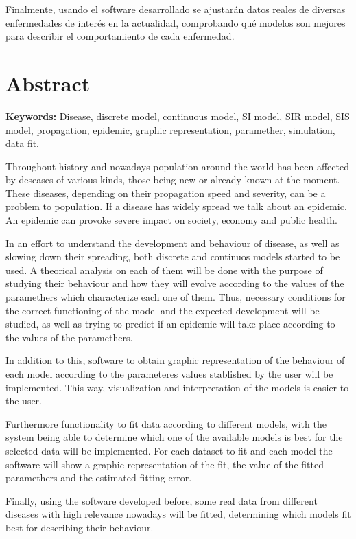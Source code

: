 Finalmente, usando el software desarrollado se ajustarán datos reales de diversas enfermedades de interés en la actualidad, comprobando qué modelos son mejores para describir el comportamiento de cada enfermedad.



\chapter*{Abstract}

\textbf{Keywords: } Disease, discrete model, continuous model, SI model, SIR model, SIS model, propagation, epidemic, graphic representation, paramether, simulation, data fit.

Throughout history and nowadays population around the world has been affected by deseases of various kinds, those being new or already known at the moment. These diseases, depending on their propagation speed and severity, can be a problem to population. If a disease has widely spread we talk about an epidemic. An epidemic can provoke severe impact on society, economy and public health.

In an effort to understand the development and behaviour of disease, as well as slowing down their spreading, both discrete and continuos models started to be used. A theorical analysis on each of them will be done with the purpose of studying their behaviour and how they will evolve according to the values of the paramethers which characterize each one of them. Thus, necessary conditions for the correct functioning of the model and the expected development will be studied, as well as trying to predict if an epidemic will take place according to the values of the paramethers.

In addition to this, software  to obtain graphic representation of the behaviour of each model according to the parameteres values stablished by the user will be implemented. This way, visualization and interpretation of the models is easier to the user.

Furthermore functionality to fit data according to different models, with the system being able to determine which one of the available models is best for the selected data will be implemented. For each dataset to fit and each model the software will show a graphic representation of the fit, the value of the fitted paramethers and the estimated fitting error.

Finally, using the software developed before, some real data from different diseases with high relevance nowadays will be fitted, determining which models fit best for describing their behaviour.

